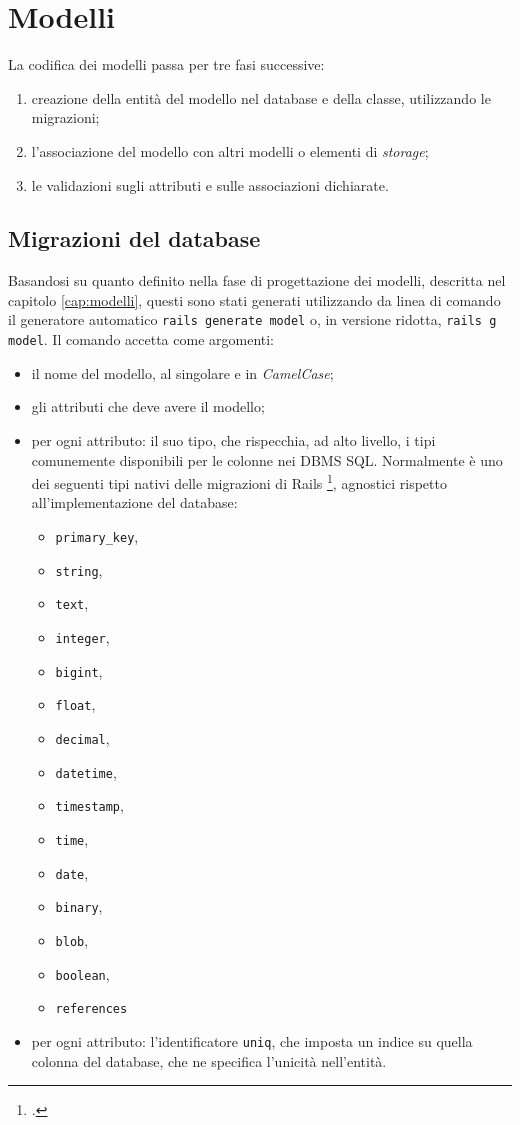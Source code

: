 \section{Modelli}
La codifica dei modelli passa per tre fasi successive:
\begin{enumerate}
	\item creazione della entità del modello nel database e della classe, utilizzando le migrazioni;
	\item l'associazione del modello con altri modelli o elementi di \emph{storage};
	\item le validazioni sugli attributi e sulle associazioni dichiarate.
\end{enumerate}

\subsection{Migrazioni del database}
Basandosi su quanto definito nella fase di progettazione dei modelli, descritta nel capitolo \ref{cap:modelli}, questi sono stati generati utilizzando da linea di comando il generatore automatico \verb|rails generate model| o, in versione ridotta, \verb|rails g model|. Il comando accetta come argomenti:
\begin{itemize}
	\item il nome del modello, al singolare e in \emph{CamelCase};
	\item gli attributi che deve avere il modello;
	\item per ogni attributo: il suo tipo, che rispecchia, ad alto livello, i tipi comunemente disponibili per le colonne nei DBMS SQL. Normalmente è uno dei seguenti tipi nativi delle migrazioni di Rails \footcite{site:migration-types}, agnostici rispetto all'implementazione del database:
	\begin{itemize}
		\item \verb|primary_key|,
		\item \verb|string|,
		\item \verb|text|,
		\item \verb|integer|,
		\item \verb|bigint|,
		\item \verb|float|,
		\item \verb|decimal|,
		\item \verb|datetime|,
		\item \verb|timestamp|,
		\item \verb|time|,
		\item \verb|date|,
		\item \verb|binary|,
		\item \verb|blob|,
		\item \verb|boolean|,
		\item \verb|references|
	\end{itemize}
	\item per ogni attributo: l'identificatore \verb|uniq|, che imposta un indice su quella colonna del database, che ne specifica l'unicità nell'entità.
\end{itemize}
